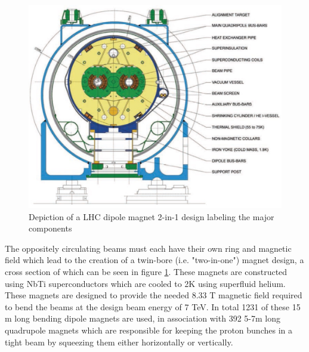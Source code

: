 \begin{figure}[!htbp] 
  \begin{center}
    \includegraphics[width=0.9\linewidth]{figures/lhc/dipole.jpg}
    \caption{ Depiction of a LHC dipole magnet 2-in-1 design labeling the major
components} 
    \label{fig:dipole} 
  \end{center} 
\end{figure}

The oppositely circulating beams must each  have their own ring and magnetic field
which lead to the creation of a twin-bore (i.e. "two-in-one") magnet design, a
cross section of which can be seen in figure \ref{fig:dipole}. These magnets are constructed
using NbTi superconductors which are cooled to 2K using superfluid helium.
These magnets are designed to provide the needed 8.33 T magnetic field required
to bend the beams at the design beam energy of 7 TeV.  In total 1231 of these 15
m long bending dipole magnets are used, in association with 392 5-7m long
quadrupole magnets which are responsible for keeping the proton bunches in a
tight beam by squeezing them either horizontally or vertically.
